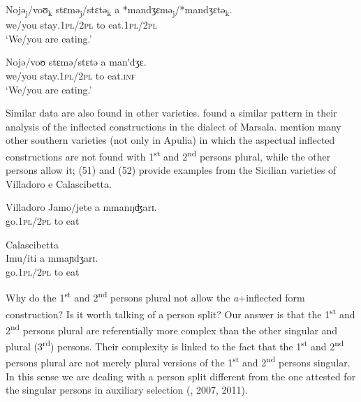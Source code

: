 \documentclass[output=paper]{langsci/langscibook}
\begin{document}
\ea%
    \label{ex:lorusso:50}
    \gll Nojə\textsubscript{j}/voʊ\textsubscript{k}   stɛmə\textsubscript{j}/stɛtə\textsubscript{k}   a       *mandʒɛmə\textsubscript{j}/*mandʒɛtə\textsubscript{k}.\\
         we/you  stay\textsc{.1pl/2pl}  to   eat.\textsc{1pl/2pl}\\
    \glt ‘We/you are eating.’
\z


\ea%
    \label{ex:lorusso:51}
    \gll Nojə/voʊ   stɛmə/stɛtə  a   manʹdʒɛ.\\
         we/you  stay.\textsc{1pl/2pl}  to   eat\textsc{.inf}\\
    \glt ‘We/you are eating.’
\z


Similar data are also found in other varieties. \citet{Cardinaletti2003} found a similar pattern in their analysis of the inflected constructions in the dialect of Marsala. \citet{Manzini2005} mention many other southern varieties (not only in Apulia) in which the aspectual inflected constructions are not found with 1\textsuperscript{st} and 2\textsuperscript{nd} persons plural, while the other persons allow it; (51) and (52) provide examples from the Sicilian varieties of Villadoro e Calascibetta.

\ea%
         Villadoro\label{ex:lorusso:52}
    \gll Jamo/jete   a   mmanŋʤarɪ.\\
         go.\textsc{1pl/2pl}   to  eat \\
    \z


\ea%
         Calascibetta\label{ex:lorusso:53}\\
    \gll Imu/iti   a  mmaɲdʒarɪ.  \\
         go.\textsc{1pl/2pl} to  eat \\
    \z

Why do the 1\textsuperscript{st} and 2\textsuperscript{nd} persons plural not allow the \textit{a}+inflected form construction? Is it worth talking of a person split? Our answer is that the 1\textsuperscript{st} and 2\textsuperscript{nd} persons plural are referentially more complex than the other singular and plural (3\textsuperscript{rd}) persons. Their complexity is linked to the fact that the 1\textsuperscript{st} and 2\textsuperscript{nd} persons plural are not merely plural versions of the 1\textsuperscript{st} and 2\textsuperscript{nd} persons singular. In this sense we are dealing with a person split different from the one attested for the singular persons in auxiliary selection (\citealt{Manzini2005}, 2007, 2011).
\end{document}

